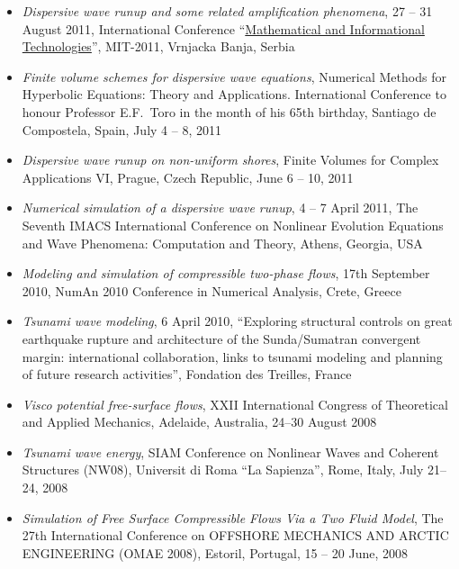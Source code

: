 \documentclass[final, a4paper, oneside, 12pt]{article}
\numberwithin{equation}{section}
\begin{document}
\begin{itemize}
  \item \textit{Dispersive wave runup and some related amplification phenomena}, 27 -- 31 August 2011, International Conference ``\href{http://mit.rs/2011/index.html}{Mathematical and Informational Technologies}'', MIT-2011, Vrnjacka Banja, Serbia
  
  \item \textit{Finite volume schemes for dispersive wave equations}, Numerical Methods for Hyperbolic Equations: Theory and Applications. International Conference to honour Professor E.F.~Toro in the month of his 65th birthday, Santiago de Compostela, Spain, July 4 -- 8, 2011
  
  \item \textit{Dispersive wave runup on non-uniform shores}, Finite Volumes for Complex Applications VI, Prague, Czech Republic, June 6 -- 10, 2011
  
  \item \textit{Numerical simulation of a dispersive wave runup}, 4 -- 7 April 2011, The Seventh IMACS International Conference on Nonlinear Evolution Equations and Wave Phenomena: Computation and Theory, Athens, Georgia, USA
  
  \item \textit{Modeling and simulation of compressible two-phase flows}, 17th September 2010, NumAn 2010 Conference in Numerical Analysis, Crete, Greece
  
  \item \textit{Tsunami wave modeling}, 6 April 2010, ``Exploring structural controls on great earthquake rupture and architecture of the Sunda/Sumatran convergent margin: international collaboration, links to tsunami modeling and planning of future research activities'', Fondation des Treilles, France
  
  \item \textit{Visco potential free-surface flows}, XXII International Congress of Theoretical and Applied Mechanics, Adelaide, Australia, 24--30 August 2008
  
  \item \textit{Tsunami wave energy}, SIAM Conference on Nonlinear Waves and Coherent Structures (NW08), Universit di Roma ``La Sapienza'', Rome, Italy, July 21--24, 2008
  
  \item \textit{Simulation of Free Surface Compressible Flows Via a Two Fluid Model}, The 27th International Conference on OFFSHORE MECHANICS AND ARCTIC ENGINEERING (OMAE 2008), Estoril, Portugal, 15 -- 20 June, 2008
  

\end{itemize}
\end{document}
